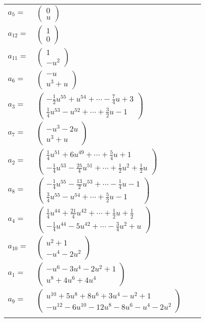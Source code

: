 \documentclass[1p]{elsarticle_modified}
\theoremstyle{definition}
\begin{document}
\begin{tabular}{m{7pt} m{180pt} m{7pt} m{180pt} }
\flushright $a_{5}=$&$\begin{pmatrix}0\\u\end{pmatrix}$ \\
\flushright $a_{12}=$&$\begin{pmatrix}1\\0\end{pmatrix}$ \\
\flushright $a_{11}=$&$\begin{pmatrix}1\\- u^2\end{pmatrix}$ \\
\flushright $a_{6}=$&$\begin{pmatrix}- u\\u^3+u\end{pmatrix}$ \\
\flushright $a_{3}=$&$\begin{pmatrix}-\frac{1}{2} u^{55}+u^{54}+\cdots-\frac{7}{4} u+3\\\frac{1}{4} u^{53}- u^{52}+\cdots+\frac{3}{2} u-1\end{pmatrix}$ \\
\flushright $a_{7}=$&$\begin{pmatrix}- u^3-2 u\\u^3+u\end{pmatrix}$ \\
\flushright $a_{2}=$&$\begin{pmatrix}\frac{1}{4} u^{51}+6 u^{49}+\cdots+\frac{5}{4} u+1\\-\frac{1}{4} u^{53}-\frac{25}{4} u^{51}+\cdots+\frac{1}{2} u^2+\frac{1}{2} u\end{pmatrix}$ \\
\flushright $a_{8}=$&$\begin{pmatrix}-\frac{1}{4} u^{55}-\frac{13}{2} u^{53}+\cdots-\frac{1}{4} u-1\\\frac{3}{4} u^{55}- u^{54}+\cdots+\frac{5}{2} u-1\end{pmatrix}$ \\
\flushright $a_{4}=$&$\begin{pmatrix}\frac{1}{4} u^{44}+\frac{21}{4} u^{42}+\cdots+\frac{1}{2} u+\frac{1}{2}\\-\frac{1}{4} u^{44}-5 u^{42}+\cdots-\frac{3}{4} u^2+u\end{pmatrix}$ \\
\flushright $a_{10}=$&$\begin{pmatrix}u^2+1\\- u^4-2 u^2\end{pmatrix}$ \\
\flushright $a_{1}=$&$\begin{pmatrix}- u^6-3 u^4-2 u^2+1\\u^8+4 u^6+4 u^4\end{pmatrix}$ \\
\flushright $a_{9}=$&$\begin{pmatrix}u^{10}+5 u^8+8 u^6+3 u^4- u^2+1\\- u^{12}-6 u^{10}-12 u^8-8 u^6- u^4-2 u^2\end{pmatrix}$\\&\end{tabular}
\end{document}
